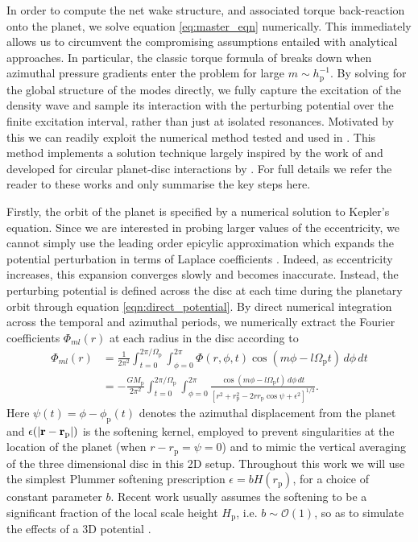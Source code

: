 In order to compute the net wake structure, and associated torque back-reaction onto the planet, we solve equation \eqref{eq:master_eqn} numerically. This immediately allows us to circumvent the compromising assumptions entailed with analytical approaches. In particular, the classic torque formula of \cite{GoldreichTremaine_1979} breaks down when azimuthal pressure gradients enter the problem for large $m\sim h_{\textrm{p}}^{-1}$. By solving for the global structure of the modes directly, we fully capture the excitation of the density wave and sample its interaction with the perturbing potential over the finite excitation interval, rather than just at isolated resonances. Motivated by this we can readily exploit the numerical method tested and used in . This method implements a solution technique largely inspired by the work of \cite{KorycanskyPollack_1993} and developed for circular planet-disc interactions by \cite{MirandaRafikov_2020}. For full details we refer the reader to these works and only summarise the key steps here. 

Firstly, the orbit of the planet is specified by a numerical solution to Kepler's equation. Since we are interested in probing larger values of the eccentricity, we cannot simply use the leading order epicylic approximation which expands the potential perturbation in terms of Laplace coefficients \citep[e.g.][]{GoldreichTremaine_1980}. Indeed, as eccentricity increases, this expansion converges slowly and becomes inaccurate. Instead, the perturbing potential is defined across the disc at each time during the planetary orbit through equation \eqref{eqn:direct_potential}. By direct numerical integration across the temporal and azimuthal periods, we numerically extract the Fourier coefficients $\Phi_{ml}(r)$ at each radius in the disc according to
%
\begin{align}
    \label{eq:phi_mode_integral}
    \Phi_{ml}(r) &= \frac{1}{2\pi^2}\int_{t = 0}^{2\pi/\Omega_\textrm{p}} \int_{\phi = 0}^{2\pi} \Phi(r,\phi,t) \cos(m\phi-l \Omega_\textrm{p} t) \,d\phi\,dt \nonumber\\
             &= -\frac{GM_{\text{p}}}{2\pi^2}\int_{t = 0}^{2\pi/\Omega_\textrm{p}} \int_{\phi = 0}^{2\pi} \frac{\cos(m\phi-l \Omega_\textrm{p} t) \,d\phi\,dt}{\left[r^2+r_{\text{p}}^2-2 r r_{\text{p}} \cos\psi+\epsilon^2\right]^{1/2}} . 
\end{align}
%
Here $\psi(t) = \phi-\phi_{\text{p}}(t)$ denotes the azimuthal displacement from the planet and $\epsilon(|{\bf r}-{\bf r}_\textrm{p}|)$ is the softening kernel, employed to prevent singularities at the location of the planet (when $r - r_{\text{p}} = \psi = 0$) and to mimic the vertical averaging of the three dimensional disc in this 2D setup. Throughout this work we will use the simplest Plummer softening prescription $\epsilon = b H(r_\textrm{p})$, for a choice of constant parameter $b$. Recent work usually assumes the softening to be a significant fraction of the local scale height $H_\textrm{p}$, i.e. $b\sim \mathcal{O}(1)$, so as to simulate the effects of a 3D potential \citep[e.g.][]{PaardekooperPapaloizou_2009}. 

